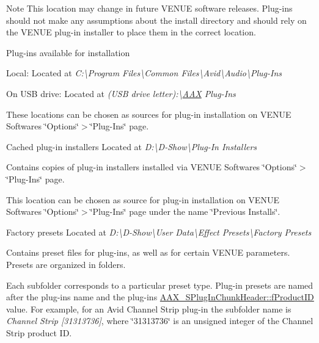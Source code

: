  \begin{DoxyNote}{Note}
This location may change in future V\+E\+N\+U\+E software releases. Plug-\/ins should not make any assumptions about the install directory and should rely on the V\+E\+N\+U\+E plug-\/in installer to place them in the correct location.
\end{DoxyNote}
Plug-\/ins available for installation 
\begin{DoxyItemize}
\item Local\+: Located at {\itshape C\+:\textbackslash{}Program Files\textbackslash{}Common Files\textbackslash{}Avid\textbackslash{}Audio\textbackslash{}Plug-\/\+Ins}  
\item On U\+S\+B drive\+: Located at {\itshape (U\+S\+B drive letter)\+:\textbackslash{}\hyperlink{a00288}{A\+A\+X} Plug-\/\+Ins}  
\end{DoxyItemize}

 These locations can be chosen as sources for plug-\/in installation on V\+E\+N\+U\+E Software\textquotesingle{}s \char`\"{}\+Options\char`\"{}$>$\char`\"{}\+Plug-\/\+Ins\char`\"{} page.

 Cached plug-\/in installers Located at {\itshape D\+:\textbackslash{}D-\/\+Show\textbackslash{}Plug-\/\+In Installers}

 Contains copies of plug-\/in installers installed via V\+E\+N\+U\+E Software\textquotesingle{}s \char`\"{}\+Options\char`\"{}$>$\char`\"{}\+Plug-\/\+Ins\char`\"{} page.

 This location can be chosen as source for plug-\/in installation on V\+E\+N\+U\+E Software\textquotesingle{}s \char`\"{}\+Options\char`\"{}$>$\char`\"{}\+Plug-\/\+Ins\char`\"{} page under the name \char`\"{}\+Previous Installs\char`\"{}.

 Factory presets Located at {\itshape D\+:\textbackslash{}D-\/\+Show\textbackslash{}User Data\textbackslash{}Effect Presets\textbackslash{}Factory Presets}

 Contains preset files for plug-\/ins, as well as for certain V\+E\+N\+U\+E parameters. Presets are organized in folders.

 Each subfolder corresponds to a particular preset type. Plug-\/in presets are named after the plug-\/in\textquotesingle{}s name and the plug-\/in\textquotesingle{}s \hyperlink{a00126_afbed1db12ae1f7cb3204dad3fd66070e}{A\+A\+X\+\_\+\+S\+Plug\+In\+Chunk\+Header\+::f\+Product\+I\+D} value. For example, for an Avid Channel Strip plug-\/in the subfolder name is {\itshape Channel Strip \mbox{[}31313736\mbox{]}}, where \char`\"{}31313736\char`\"{} is an unsigned integer of the Channel Strip product I\+D.

